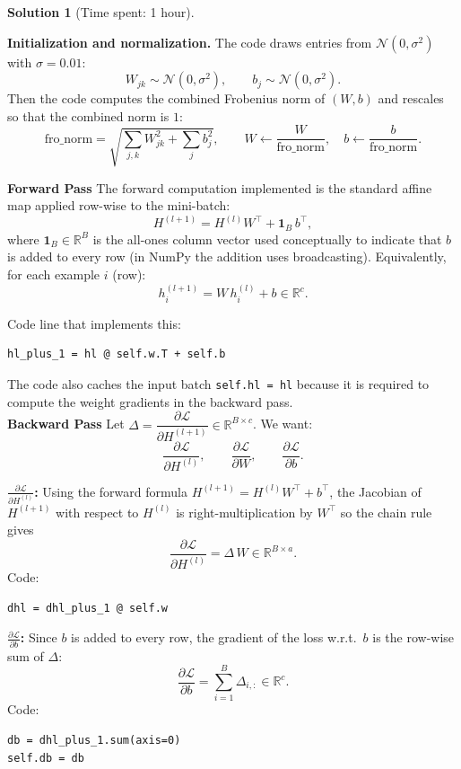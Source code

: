 \documentclass[11pt, reqno, letterpaper, twoside]{amsart}
\theoremstyle{plain}
\theoremstyle{definition}
\newtheorem{solution}[theorem]{Solution}
\begin{document}
\begin{solution}[Time spent: 1 hour]
\begin{enumerate}
\textbf{Initialization and normalization.}
The code draws entries from $\mathcal{N}(0,\sigma^2)$ with $\sigma=0.01$:
\[
W_{jk}\sim\mathcal{N}(0,\sigma^2),\qquad b_j\sim\mathcal{N}(0,\sigma^2).
\]
Then the code computes the combined Frobenius norm of $(W,b)$ and rescales so that the combined norm is $1$: 
\[
\text{fro\_norm}=\sqrt{\sum_{j,k}W_{jk}^2+\sum_j b_j^2},\qquad
W\leftarrow \frac{W}{\text{fro\_norm}},\quad
b\leftarrow\frac{b}{\text{fro\_norm}}.
\]

\textbf{Forward Pass}
The forward computation implemented is the standard affine map applied row-wise to the mini-batch:
\[
H^{(l+1)} = H^{(l)} W^\top + \mathbf{1}_B\, b^\top,
\]
where $\mathbf{1}_B\in\mathbb{R}^{B}$ is the all-ones column vector used conceptually to indicate that $b$ is added to every row (in NumPy the addition uses broadcasting). Equivalently, for each example $i$ (row):
\[
h^{(l+1)}_i = W\, h^{(l)}_i + b \in\mathbb{R}^c.
\]

Code line that implements this:
\begin{verbatim}
hl_plus_1 = hl @ self.w.T + self.b
\end{verbatim}
The code also caches the input batch \verb|self.hl = hl| because it is required to compute the weight gradients in the backward pass.  \\

\textbf{Backward Pass}
Let $\Delta=\dfrac{\partial\mathcal{L}}{\partial H^{(l+1)}}\in\mathbb{R}^{B\times c}$.
We want:
\[
\frac{\partial\mathcal{L}}{\partial H^{(l)}},\qquad
\frac{\partial\mathcal{L}}{\partial W},\qquad
\frac{\partial\mathcal{L}}{\partial b}.
\]

\textbf{$\frac{\partial\mathcal{L}}{\partial H^{(l)}}$: }
Using the forward formula $H^{(l+1)}=H^{(l)}W^\top+b^\top$, the Jacobian of $H^{(l+1)}$ with respect to $H^{(l)}$ is right-multiplication by $W^\top$ so the chain rule gives
\[
\frac{\partial\mathcal{L}}{\partial H^{(l)}} = \Delta\, W \in\mathbb{R}^{B\times a}.
\]
Code:
\begin{verbatim}
dhl = dhl_plus_1 @ self.w
\end{verbatim}

\textbf{$\frac{\partial\mathcal{L}}{\partial b}$:}
Since $b$ is added to every row, the gradient of the loss w.r.t.\ $b$ is the row-wise sum of $\Delta$:
\[
\frac{\partial\mathcal{L}}{\partial b} = \sum_{i=1}^B \Delta_{i,:} \in\mathbb{R}^c.
\]
Code:
\begin{verbatim}
db = dhl_plus_1.sum(axis=0)
self.db = db
\end{verbatim}


\end{enumerate}
\end{solution}
\end{document}
